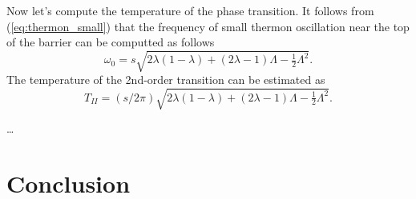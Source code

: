 \documentclass[aps, pre, preprint, groupedaddress, superscriptaddress, showkeys, showpacs] {revtex4-1}
\begin{document}
Now let's compute the temperature of the phase transition.
It follows from (\ref{eq:thermon_small}) that the frequency of small thermon oscillation near the top of the barrier can be computted as follows
%
\begin{equation}
\omega_0 = s \sqrt{2 \lambda (1 - \lambda) + (2 \lambda - 1) \Lambda - \tfrac{1}{2} \Lambda^2}.
\label{eq:period_small}
\end{equation}
%
The temperature of the 2nd-order transition can be estimated as
\begin{equation}
T_{II} = (s  / 2 \pi) \sqrt{2 \lambda (1 - \lambda) + (2 \lambda - 1) \Lambda - \tfrac{1}{2} \Lambda^2}.
\end{equation}

\dots

\section{Conclusion \label{sec:conclusion}}

\pagebreak


\end{document}
